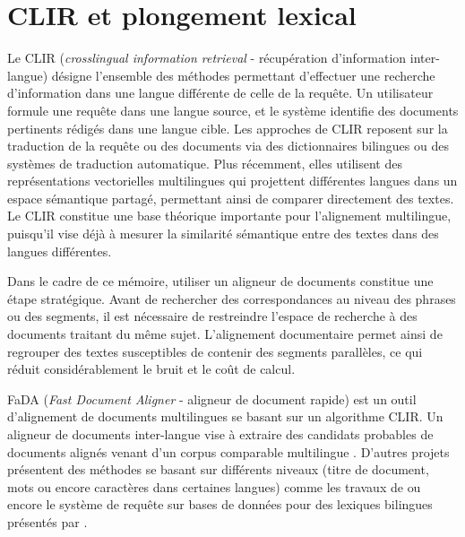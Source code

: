 \newpage

\section{CLIR et plongement lexical}

Le \gls{CLIR} (\textit{crosslingual information retrieval} -
récupération d'information inter-langue) désigne l’ensemble des méthodes permettant
d’effectuer une recherche d’information dans une langue différente de celle de la requête.
Un utilisateur formule une requête dans une langue source, et le système
identifie des documents pertinents rédigés dans une langue cible. Les approches de CLIR
reposent sur la traduction de la requête ou des documents via des dictionnaires
bilingues ou des systèmes de traduction automatique. Plus récemment, elles utilisent des
représentations vectorielles multilingues qui projettent différentes langues dans un espace sémantique partagé,
permettant ainsi de comparer directement des textes. Le CLIR
constitue une base théorique importante pour l’alignement multilingue, puisqu’il vise déjà
à mesurer la similarité sémantique entre des textes dans des langues différentes.

Dans le cadre de ce mémoire, utiliser
un aligneur de documents constitue une étape stratégique. Avant de rechercher
des correspondances au niveau des phrases ou des segments, il est nécessaire de restreindre
l’espace de recherche à des documents traitant du même sujet. L’alignement documentaire permet
ainsi de regrouper des textes susceptibles de contenir des segments parallèles, ce qui réduit
considérablement le bruit et le coût de calcul.

FaDA (\textit{Fast Document Aligner} - aligneur de document rapide) \citep{lohar_2016} est un outil d'alignement
de documents multilingues se basant sur un algorithme CLIR. Un
aligneur de documents inter-langue vise à extraire des candidats probables de documents
alignés venant d'un corpus comparable multilingue \citep{lohar_2016}. D'autres projets présentent des méthodes
se basant sur différents niveaux (titre de document, mots ou encore caractères dans certaines langues) comme les travaux de
\citet{yang_2003} ou encore le système de requête sur bases de données pour des lexiques bilingues présentés
par \citet{munteanu_2005}.

